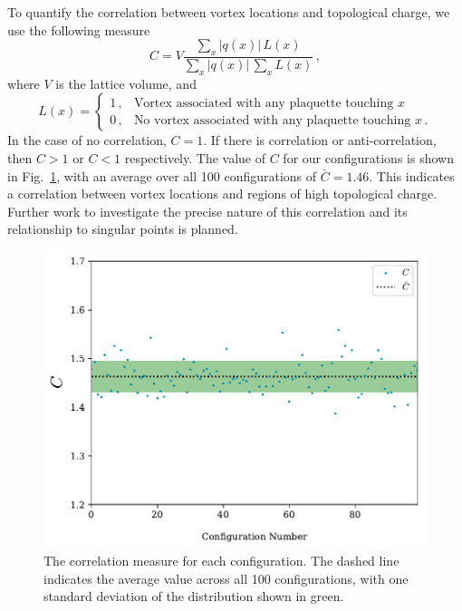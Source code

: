 To quantify the correlation between vortex locations and topological charge, we use the following measure
%
\begin{equation}
C = V\frac{\sum_x |q(x)|\,L(x)}{\sum_x |q(x)|\,\sum_x L(x)}\, ,
\end{equation}
%
where $V$ is the lattice volume, and
%
\begin{equation}
L(x) = 
\begin{cases}
1\, , & \text{Vortex associated with any plaquette touching $x$}\\
0\, , & \text{No vortex associated with any plaquette touching $x$}\, .
\end{cases}
\end{equation}
%
In the case of no correlation, $C=1$. If there is correlation or anti-correlation, then $C>1$ or $C<1$ respectively. The value of $C$ for our configurations is shown in Fig.~\ref{fig:Correlation}, with an average over all 100 configurations of $\bar{C} = 1.46$. This indicates a correlation between vortex locations and regions of high topological charge. Further work to investigate the precise nature of this correlation and its relationship to singular points is planned.\\
%
\begin{figure}[H]
\centering
\includegraphics[width=0.8\linewidth]{./Correlation.pdf}
\caption[The correlation measure for each configuration.]{\label{fig:Correlation} The correlation measure for each configuration. The dashed line indicates the average value across all 100 configurations, with one standard deviation of the distribution shown in green.}
\end{figure}
%

